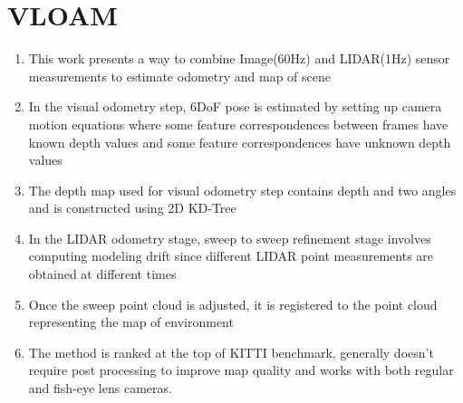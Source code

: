 \documentclass[12pt, a4paper]{article}
\begin{document}
\section{VLOAM}
\begin{enumerate}
  \item This work presents a way to combine Image(60Hz) and LIDAR(1Hz) sensor measurements to estimate odometry and map of scene
  \item In the visual odometry step, 6DoF pose is estimated by setting up camera motion equations where some feature correspondences between frames have known depth values and some feature correspondences have unknown depth values
  \item The depth map used for visual odometry step contains depth and two angles and is constructed using 2D KD-Tree
  \item In the LIDAR odometry stage, sweep to sweep refinement stage involves computing modeling drift since different LIDAR point measurements are obtained at different times
  \item Once the sweep point cloud is adjusted, it is registered to the point cloud representing the map of environment
  \item The method is ranked at the top of KITTI benchmark, generally doesn't require post processing to improve map quality and works with both regular and fish-eye lens cameras.
\end{enumerate}
\end{document}
